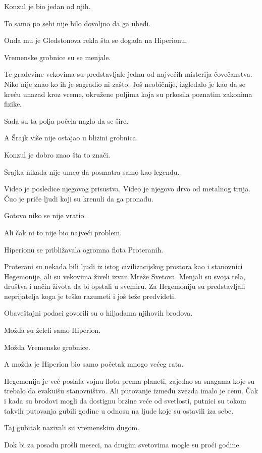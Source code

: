 Konzul je bio jedan od njih.

To samo po sebi nije bilo dovoljno da ga ubedi.

Onda mu je Gledstonova rekla šta se događa na Hiperionu.

Vremenske grobnice su se menjale.

Te građevine vekovima su predstavljale jednu od najvećih misterija čovečanstva. Niko nije znao ko ih je sagradio ni zašto. Još neobičnije, izgledalo je kao da se kreću unazad kroz vreme, okružene poljima koja su prkosila poznatim zakonima fizike.

Sada su ta polja počela naglo da se šire.

A Šrajk više nije ostajao u blizini grobnica.

Konzul je dobro znao šta to znači.

Šrajka nikada nije umeo da posmatra samo kao legendu.

Video je posledice njegovog prisustva. Video je njegovo drvo od metalnog trnja. Čuo je priče ljudi koji su krenuli da ga pronađu.

Gotovo niko se nije vratio.

Ali čak ni to nije bio najveći problem.

Hiperionu se približavala ogromna flota Proteranih.

Proterani su nekada bili ljudi iz istog civilizacijskog prostora kao i stanovnici Hegemonije, ali su vekovima živeli izvan Mreže Svetova. Menjali su svoja tela, društva i način života da bi opstali u svemiru. Za Hegemoniju su predstavljali neprijatelja koga je teško razumeti i još teže predvideti.

Obaveštajni podaci govorili su o hiljadama njihovih brodova.

Možda su želeli samo Hiperion.

Možda Vremenske grobnice.

A možda je Hiperion bio samo početak mnogo većeg rata.

Hegemonija je već poslala vojnu flotu prema planeti, zajedno sa snagama koje su trebalo da evakuišu stanovništvo. Ali putovanje između zvezda imalo je cenu. Čak i kada su brodovi mogli da dostignu brzine veće od svetlosti, putnici su tokom takvih putovanja gubili godine u odnosu na ljude koje su ostavili iza sebe.

Taj gubitak nazivali su vremenskim dugom.

Dok bi za posadu prošli meseci, na drugim svetovima mogle su proći godine.

